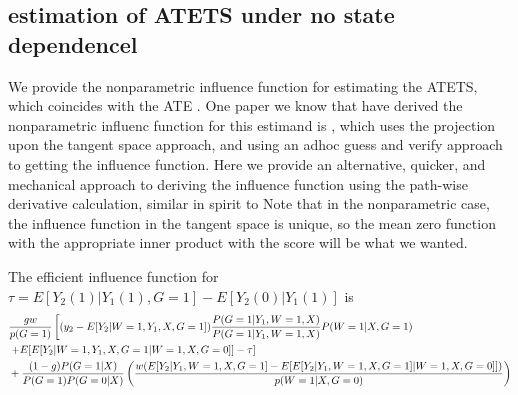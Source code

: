 \documentclass{article}
\begin{document}
\subsection{estimation of ATETS under no state dependencel}
We provide the nonparametric influence function for estimating the ATETS, which coincides with the ATE . One paper we know that have derived the nonparametric influenc function for this estimand is \cite{chen2021semiparametric} , which uses the projection upon the tangent space approach, and using an adhoc guess and verify approach to getting the influence function. Here we provide an alternative, quicker, and mechanical approach to deriving the influence function using the path-wise derivative calculation, similar in spirit to \qu \cite{ichimura2022influence}
Note that in the nonparametric case, the influence function in the tangent space is unique, so the mean zero function with the appropriate inner product with the score will be what we wanted.
\todo 
\begin{theorem} 
    The efficient influence function for $\tau = E[ Y_2(1) | Y_1(1) , G=1] - E[ Y_2(0) | Y_1(1)   ] $ is 
    \begin{align}
        &\frac{ g w }{ p(G=1) } \left[ (y_2 - E[ Y_2 | W=1 , Y_1 , X, G =1]  ) \frac{ P( G =1 | Y_1 , W=1 , X ) }{ P(G=1 | Y_1 , W=1 , X ) } P( W=1 | X , G=1)  \right. \\
        &\left.+ E [ E[ Y_2 | W = 1, Y_1 , X, G =1 | W =1, X, G= 0 ] ] - \tau\right] \\
        &+\frac{ (1- g) P(G = 1|X)   }{ P(G= 1) P ( G =0 |X) } \left( \frac{ w ( E [ Y _ 2 | Y_1,W =1 , X, G =1 ] - E [ E[ Y_2 | Y_1, W=1, X, G=1 ] | W =1, X, G= 0 ] ] ) }{ p ( W =1 | X, G =0 ) } \right)
    \end{align}
\end{theorem}
\end{document}
